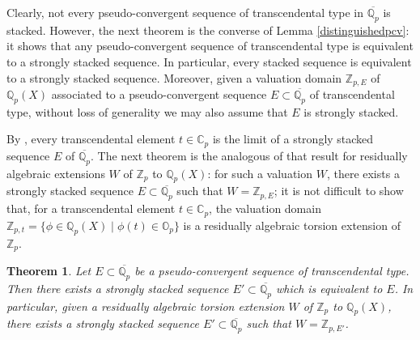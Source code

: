 \documentclass[10pt]{article}
\numberwithin{equation}{section}
\newtheorem{Thm}[equation]{Theorem}
\theoremstyle{definition}\newtheorem{Def}[equation]{Definition}
\theoremstyle{definition}\newtheorem{Ques}[equation]{Question}
\newcommand{\Q}{\mathbb{Q}}
\newcommand{\N}{\mathbb{N}}
\newcommand{\Z}{\mathbb{Z}}
\renewcommand{\O}{\mathbb{O}}
\newcommand{\C}{\mathbb{C}}
\newcommand{\oQp}{\overline{\Q_p}}
\newcommand{\oZp}{\overline{\Z_p}}
\newcommand\rc { \color{red}}
\begin{document}





Clearly, not every pseudo-convergent sequence of transcendental type in $\oQp$ is stacked. However, the next theorem is the converse of Lemma \ref{distinguishedpcv}: it shows that any  pseudo-convergent sequence of transcendental type is equivalent to a strongly stacked  sequence. In particular, every stacked sequence is equivalent to a strongly stacked sequence.  Moreover, given a valuation domain $\Z_{p,E}$ of $\Q_p(X)$ associated to a pseudo-convergent sequence $E\subset\oQp$ of transcendental type,   without loss of generality we may also assume that $E$ is strongly stacked.

By \cite[Proposition 2.2]{APZclosed}, every transcendental element $t\in\C_p$ is the limit of a strongly stacked sequence $E$ of $\oQp$. The next theorem is the analogous of that result for residually algebraic extensions $W$ of $\Z_p$ to $\Q_p(X)$: for such a valuation $W$, there exists a strongly stacked sequence $E\subset\oQp$ such that $W=\Z_{p,E}$; it is not difficult to show that, for a transcendental element $t\in\C_p$, the valuation domain $\Z_{p,t}=\{\phi\in\Q_p(X)\mid\phi(t)\in \O_p\}$ is a residually algebraic torsion extension of $\Z_p$. 

\begin{Thm}\label{Epcvtranscdistinguished}
Let $E\subset\oQp$ be a pseudo-convergent sequence of transcendental type. Then there exists a strongly stacked sequence $E'\subset\oQp$ which is equivalent to $E$. In particular, given a residually algebraic torsion extension $W$ of $\Z_p$ to $\Q_p(X)$, there exists a strongly stacked sequence $E'\subset\oQp$ such that $W=\Z_{p,E'}$.
\end{Thm}
\end{document}
